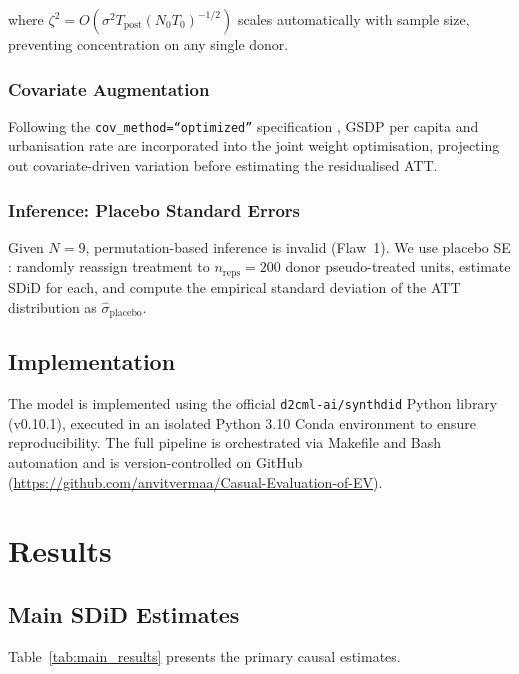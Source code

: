 \documentclass[journal]{IEEEtran}
\begin{document}
where $\zeta^2 = O\!\left(\sigma^2 T_{\mathrm{post}} 
(N_0 T_0)^{-1/2}\right)$ scales automatically with sample size, 
preventing concentration on any single donor.

\subsubsection{Covariate Augmentation}
Following the \texttt{cov\_method=``optimized''} specification
\citep[Eq.~4.1]{Arkhangelsky2021}, GSDP per capita and urbanisation 
rate are incorporated into the joint weight optimisation, projecting 
out covariate-driven variation before estimating the residualised ATT.

\subsubsection{Inference: Placebo Standard Errors}
Given $N = 9$, permutation-based inference is invalid (Flaw~1). We
use placebo SE \citep[Section~5]{Arkhangelsky2021}: randomly reassign
treatment to $n_{\mathrm{reps}} = 200$ donor pseudo-treated units,
estimate SDiD for each, and compute the empirical standard deviation
of the ATT distribution as $\hat{\sigma}_{\mathrm{placebo}}$.

\subsection{Implementation}
The model is implemented using the official \texttt{d2cml-ai/synthdid}
Python library (v0.10.1), executed in an isolated Python 3.10 Conda
environment to ensure reproducibility. The full pipeline is
orchestrated via Makefile and Bash automation and is version-controlled
on GitHub (\url{https://github.com/anvitvermaa/Casual-Evaluation-of-EV}).

\section{Results}
\label{sec:results}

\subsection{Main SDiD Estimates}

Table~\ref{tab:main_results} presents the primary causal estimates.
\end{document}
